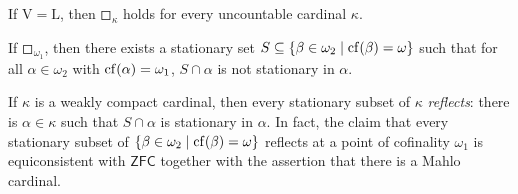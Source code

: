 \begin{theorem}[Jensen]
    If \( \mathrm{V} = \mathrm{L} \), then \( \mdwhtsquare_\kappa \) holds for every uncountable cardinal \( \kappa \).
\end{theorem}
\begin{lemma}
    If \( \mdwhtsquare_{\omega_1} \), then there exists a stationary set \( S \subseteq \qty{\beta \in \omega_2 \mid \operatorname{cf}(\beta) = \omega} \) such that for all \( \alpha \in \omega_2 \) with \( \operatorname{cf}(\alpha) = \omega_1 \), \( S \cap \alpha \) is not stationary in \( \alpha \).
\end{lemma}
\begin{remark}
    If \( \kappa \) is a weakly compact cardinal, then every stationary subset of \( \kappa \) \emph{reflects}: there is \( \alpha \in \kappa \) such that \( S \cap \alpha \) is stationary in \( \alpha \).
    In fact, the claim that every stationary subset of \( \qty{\beta \in \omega_2 \mid \operatorname{cf}(\beta) = \omega} \) reflects at a point of cofinality \( \omega_1 \) is equiconsistent with \( \mathsf{ZFC} \) together with the assertion that there is a Mahlo cardinal.
\end{remark}
